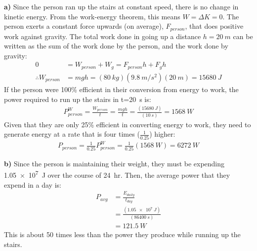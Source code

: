 \begin{finalanswer}
\end{finalanswer}

\begin{solution}
\textbf{a)} Since the person ran up the stairs at constant speed, there is no change in kinetic energy. From the work-energy theorem, this means $W=\Delta K=0$.  The person exerts a constant force upwards (on average), $F_{person}$, that does positive work against gravity. The total work done in going up a distance $h=\SI{20}{m}$ can be written as the sum of the work done by the person, and the work done by gravity:
\begin{align*}
0&=W_{person}+W_g=F_{person}h+F_gh \\
\therefore   W_{person} &= mgh = (\SI{80}{kg})(\SI{9.8}{m/s^2})(\SI{20}{m})=\SI{15680}{J} 
\end{align*}
If the person were 100\% efficient in their conversion from energy to work, the power required to run up the stairs in t=\SI{20}{s} is:
\begin{align*}
P^W_{person}=\frac{W_{person}}{t}=\frac{mgh}{t}=\frac{(\SI{15680}{J})}{(\SI{10}{s})}=\SI{1568}{W}
\end{align*}
Given that they are only 25\% efficient in converting energy to work, they need to generate energy at a rate that is four times ($\frac{1}{0.25}$) higher:
\begin{align*}
P_{person}=\frac{1}{0.25}P^W_{person}=\frac{1}{0.25}(\SI{1568}{W})=\SI{6272}{W}
\end{align*}

\textbf{b)} Since the person is maintaining their weight, they must be expending \SI{1.05e7}{J} over the course of \SI{24}{hr}. Then, the average power that they expend in a day is:
\begin{align*}
P_{avg} &= \frac{E_{daily}}{t_{day}} \\
&= \frac{(\SI{1.05e7}{J})}{(\SI{86400}{s})}\\
&=\SI{121.5}{W}
\end{align*}
This is about 50 times less than the power they produce while running up the stairs.
\end{solution}

